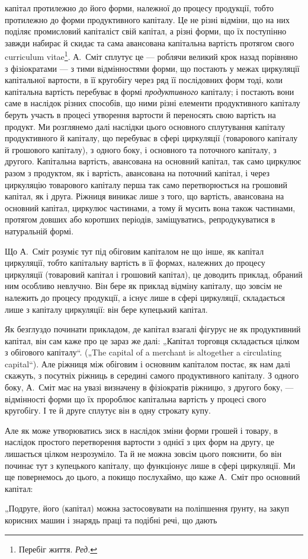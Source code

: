 \parcont{}  %
капітал протилежно до його форми, належної до процесу продукції,
тобто протилежно до форми продуктивного капіталу. Це не різні
відміни, що на них поділяє промисловий капіталіст свій капітал, а різні
форми, що їх поступінно завжди набирає й скидає та сама авансована
капітальна вартість протягом свого curriculum vitae\footnote*{
Перебіг життя. \emph{Ред.}
}. А.~Сміт сплутує це —
роблячи великий крок назад порівняно з фізіократами — з тими відмінностями
форми, що постають у межах циркуляції капітальної вартости, в її кругобігу
через ряд її послідовних форм тоді, коли капітальна вартість перебуває
в формі \emph{продуктивного} капіталу; і постають вони саме в наслідок
різних способів, що ними різні елементи продуктивного капіталу беруть
участь в процесі утворення вартости й переносять свою вартість на продукт.
Ми розглянемо далі наслідки цього основного сплутування капіталу
продуктивного й капіталу, що перебуває в сфері циркуляції (товарового
капіталу й грошового капіталу), з одного боку, і основного та поточного
капіталу, з другого. Капітальна вартість, авансована на основний капітал,
так само циркулює разом з продуктом, як і вартість, авансована на поточний
капітал, і через циркуляцію товарового капіталу перша так само перетворюється
на грошовий капітал, як і друга. Ріжниця виникає лише з того,
що вартість, авансована на основний капітал, циркулює частинами, а тому
й мусить вона також частинами, протягом довших або коротших періодів,
заміщуватись, репродукуватися в натуральній формі.

Що А.~Сміт розуміє тут під обіговим капіталом не що інше, як капітал
циркуляції, тобто капітальну вартість в її формах, належних до процесу
циркуляції (товаровий капітал і грошовий капітал), це доводить приклад,
обраний ним особливо невлучно. Він бере як приклад відміну капіталу, що
зовсім не належить до процесу продукції, а існує лише в сфері циркуляції,
складається лише з капіталу циркуляції: він бере купецький капітал.

Як безглуздо починати прикладом, де капітал взагалі фігурує не як
продуктивний капітал, він сам каже про це зараз же далі: „Капітал торговця
складається цілком з обігового капіталу“. („The capital of a merchant
is altogether a circulating capital“). Але ріжниця між обіговим і основним
капіталом постає, як нам далі скажуть, з посутніх ріжниць в середині
самого продуктивного капіталу. З одного боку, А.~Сміт має на
увазі визначену в фізіократів ріжницю, з другого боку, — відмінності форми
що їх пророблює капітальна вартість у процесі свого кругобігу. І те
й друге сплутує він в одну строкату купу.

Але як може утворюватись зиск в наслідок зміни форми грошей і
товару, в наслідок простого перетворення вартости з однієї з цих форм
на другу, це лишається цілком незрозуміло. Та й не можна зовсім цього
пояснити, бо він починає тут з купецького капіталу, що функціонує
лише в сфері циркуляції. Ми ще повернемось до цього, а покищо послухаймо,
що каже А.~Сміт про основний капітал:

„Подруге, його (капітал) можна застосовувати на поліпшення ґрунту,
на закуп корисних машин і знарядь праці та подібні речі, що дають
\parbreak{}  %
